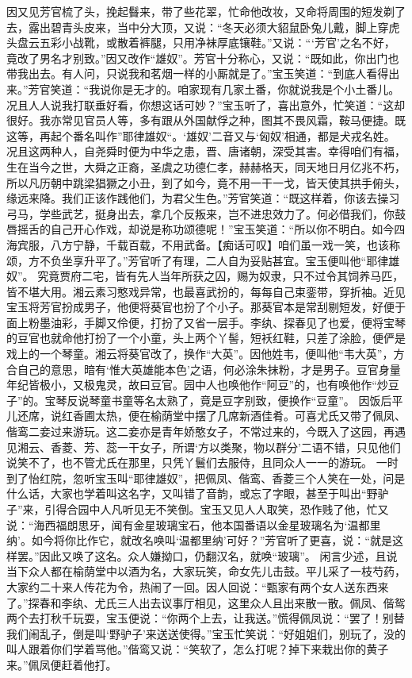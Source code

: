\documentclass[12pt,oneside]{book}
\begin{document}
因又见芳官梳了头，挽起䰖来，带了些花翠，忙命他改妆，又命将周围的短发剃了去，露出碧青头皮来，当中分大顶，又说：“冬天必须大貂鼠卧兔儿戴，脚上穿虎头盘云五彩小战靴，或散着裤腿，只用净袜厚底镶鞋。”又说：“‘芳官’之名不好，竟改了男名才别致。”因又改作“雄奴”。芳官十分称心，又说：“既如此，你出门也带我出去。有人问，只说我和茗烟一样的小厮就是了。”宝玉笑道：“到底人看得出来。”芳官笑道：“我说你是无才的。咱家现有几家土番，你就说我是个小土番儿。况且人人说我打联垂好看，你想这话可妙？”宝玉听了，喜出意外，忙笑道：“这却很好。我亦常见官员人等，多有跟从外国献俘之种，图其不畏风霜，鞍马便捷。既这等，再起个番名叫作”耶律雄奴“。‘雄奴’二音又与‘匈奴’相通，都是犬戎名姓。况且这两种人，自尧舜时便为中华之患，晋、唐诸朝，深受其害。幸得咱们有福，生在当今之世，大舜之正裔，圣虞之功德仁孝，赫赫格天，同天地日月亿兆不朽，所以凡历朝中跳梁猖獗之小丑，到了如今，竟不用一干一戈，皆天使其拱手俯头，缘远来降。我们正该作践他们，为君父生色。”芳官笑道：“既这样着，你该去操习弓马，学些武艺，挺身出去，拿几个反叛来，岂不进忠效力了。何必借我们，你鼓唇摇舌的自己开心作戏，却说是称功颂德呢！”宝玉笑道：“所以你不明白。如今四海宾服，八方宁静，千载百载，不用武备。【痴话可叹】咱们虽一戏一笑，也该称颂，方不负坐享升平了。”芳官听了有理，二人自为妥贴甚宜。宝玉便叫他“耶律雄奴”。
究竟贾府二宅，皆有先人当年所获之囚，赐为奴隶，只不过令其饲养马匹，皆不堪大用。湘云素习憨戏异常，也最喜武扮的，每每自己束銮带，穿折袖。近见宝玉将芳官扮成男子，他便将葵官也扮了个小子。那葵官本是常刮剔短发，好便于面上粉墨油彩，手脚又伶便，打扮了又省一层手。李纨、探春见了也爱，便将宝琴的豆官也就命他打扮了一个小童，头上两个丫髻，短袄红鞋，只差了涂脸，便俨是戏上的一个琴童。湘云将葵官改了，换作“大英”。因他姓韦，便叫他“韦大英”，方合自己的意思，暗有‘惟大英雄能本色’之语，何必涂朱抹粉，才是男子。豆官身量年纪皆极小，又极鬼灵，故曰豆官。园中人也唤他作“阿豆”的，也有唤他作“炒豆子”的。宝琴反说琴童书童等名太熟了，竟是豆字别致，便换作“豆童”。
因饭后平儿还席，说红香圃太热，便在榆荫堂中摆了几席新酒佳肴。可喜尤氏又带了佩凤、偕鸾二妾过来游玩。这二妾亦是青年娇憨女子，不常过来的，今既入了这园，再遇见湘云、香菱、芳、蕊一干女子，所谓‘方以类聚，物以群分’二语不错，只见他们说笑不了，也不管尤氏在那里，只凭丫鬟们去服侍，且同众人一一的游玩。
一时到了怡红院，忽听宝玉叫“耶律雄奴”，把佩凤、偕鸾、香菱三个人笑在一处，问是什么话，大家也学着叫这名字，又叫错了音韵，或忘了字眼，甚至于叫出“野驴子”来，引得合园中人凡听见无不笑倒。宝玉又见人人取笑，恐作贱了他，忙又说：“海西福朗思牙，闻有金星玻璃宝石，他本国番语以金星玻璃名为‘温都里纳’。如今将你比作它，就改名唤叫‘温都里纳’可好？”芳官听了更喜，说：“就是这样罢。”因此又唤了这名。众人嫌拗口，仍翻汉名，就唤“玻璃”。
闲言少述，且说当下众人都在榆荫堂中以酒为名，大家玩笑，命女先儿击鼓。平儿采了一枝芍药，大家约二十来人传花为令，热闹了一回。因人回说：“甄家有两个女人送东西来了。”探春和李纨、尤氏三人出去议事厅相见，这里众人且出来散一散。佩凤、偕鸳两个去打秋千玩耍，宝玉便说：“你两个上去，让我送。”慌得佩凤说：“罢了！别替我们闹乱子，倒是叫‘野驴子’来送送使得。”宝玉忙笑说：“好姐姐们，别玩了，没的叫人跟着你们学着骂他。”偕鸾又说：“笑软了，怎么打呢？掉下来栽出你的黄子来。”佩凤便赶着他打。
\end{document}
